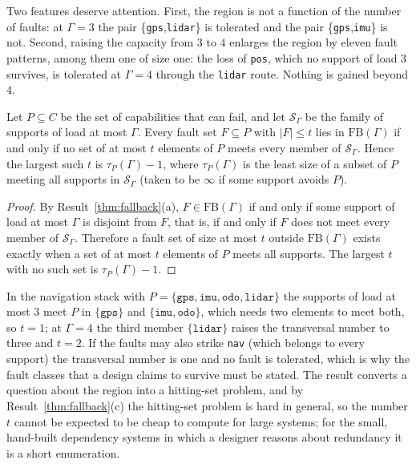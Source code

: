 Two features deserve attention. First, the region is not a function of the number of faults: at $\Gamma=3$ the pair \{\texttt{gps},\texttt{lidar}\} is tolerated and the pair \{\texttt{gps},\texttt{imu}\} is not. Second, raising the capacity from $3$ to $4$ enlarges the region by eleven fault patterns, among them one of size one: the loss of \texttt{pos}, which no support of load $3$ survives, is tolerated at $\Gamma=4$ through the \texttt{lidar} route. Nothing is gained beyond $4$.

\begin{newresult}\label{prop:transversal}
Let $P\subseteq C$ be the set of capabilities that can fail, and let $\mathcal S_\Gamma$ be the family of supports of load at most $\Gamma$. Every fault set $F\subseteq P$ with $|F|\le t$ lies in $\mathrm{FB}(\Gamma)$ if and only if no set of at most $t$ elements of $P$ meets every member of $\mathcal S_\Gamma$. Hence the largest such $t$ is $\tau_P(\Gamma)-1$, where $\tau_P(\Gamma)$ is the least size of a subset of $P$ meeting all supports in $\mathcal S_\Gamma$ (taken to be $\infty$ if some support avoids $P$).
\end{newresult}
\begin{proof}
By Result~\ref{thm:fallback}(a), $F\in\mathrm{FB}(\Gamma)$ if and only if some support of load at most $\Gamma$ is disjoint from $F$, that is, if and only if $F$ does not meet every member of $\mathcal S_\Gamma$. Therefore a fault set of size at most $t$ outside $\mathrm{FB}(\Gamma)$ exists exactly when a set of at most $t$ elements of $P$ meets all supports. The largest $t$ with no such set is $\tau_P(\Gamma)-1$.
\end{proof}

In the navigation stack with $P=\{\texttt{gps},\texttt{imu},\texttt{odo},\texttt{lidar}\}$ the supports of load at most $3$ meet $P$ in $\{\texttt{gps}\}$ and $\{\texttt{imu},\texttt{odo}\}$, which needs two elements to meet both, so $t=1$; at $\Gamma=4$ the third member $\{\texttt{lidar}\}$ raises the transversal number to three and $t=2$. If the faults may also strike \texttt{nav} (which belongs to every support) the transversal number is one and no fault is tolerated, which is why the fault classes that a design claims to survive must be stated. The result converts a question about the region into a hitting-set problem, and by Result~\ref{thm:fallback}(c) the hitting-set problem is hard in general, so the number $t$ cannot be expected to be cheap to compute for large systems; for the small, hand-built dependency systems in which a designer reasons about redundancy it is a short enumeration.

